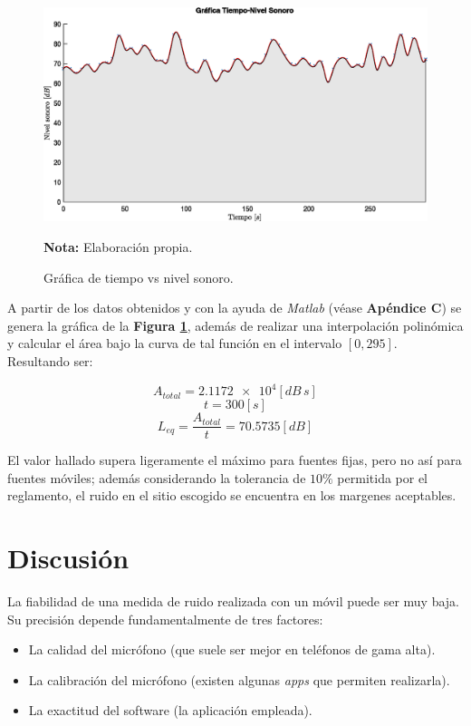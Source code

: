 \documentclass[letter,11pt]{article}
\newcommand{\source}[1]{\vspace{-11pt} \caption*{\small{\textbf{Nota:} {#1}}}}
\begin{document}
\begin{figure}
\centering
\includegraphics[width=1.0\textwidth]{resources/m1.eps}
\caption{Gráfica de tiempo vs nivel sonoro.}
\label{figura6}
\source{Elaboración propia.}
\end{figure}

A partir de los datos obtenidos y con la ayuda de \emph{Matlab} (véase
\textbf{Apéndice C}) se genera la gráfica de la \textbf{Figura \ref{figura6}},
además de realizar una interpolación polinómica y calcular el área bajo la
curva de tal función en el intervalo $[0,295]$. Resultando ser:

\begin{equation*}
    A_{total} = \num{2.1172e4} [dB\,s]
\end{equation*}
\begin{equation*}
    t = 300 [s]
\end{equation*}
\begin{equation*}
    L_{eq} = \frac{A_{total}}{t} = 70.5735 [dB]
\end{equation*}
\vspace{0.10cm}

El valor hallado supera ligeramente el máximo para fuentes fijas, pero no así
para fuentes móviles; además considerando la tolerancia de $10\%$ permitida por
el reglamento, el ruido en el sitio escogido se encuentra en los margenes
aceptables.

\section{Discusión}

La fiabilidad de una medida de ruido realizada con un móvil puede ser muy baja.
Su precisión depende fundamentalmente de tres factores:

\begin{itemize}
\item La calidad del micrófono (que suele ser mejor en teléfonos de gama alta).
\item La calibración del micrófono (existen algunas \emph{apps} que permiten
    realizarla).
\item La exactitud del software (la aplicación empleada).
\end{itemize}
\end{document}
